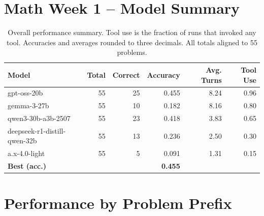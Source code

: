 \documentclass{article}
\begin{document}
\section*{Math Week 1 -- Model Summary}

\begin{table}[h!]
\centering
\begin{tabular}{lrrrrr}
\toprule
\textbf{Model} & \textbf{Total} & \textbf{Correct} & \textbf{Accuracy} & \textbf{Avg. Turns} & \textbf{Tool Use} \\
\midrule
gpt-oss-20b                  & 55 & 25 & 0.455 & 8.24 & 0.96 \\
gemma-3-27b                  & 55 & 10 & 0.182 & 8.16 & 0.80 \\
qwen3-30b-a3b-2507           & 55 & 23 & 0.418 & 3.83 & 0.65 \\
deepseek-r1-distill-qwen-32b & 55 & 13 & 0.236 & 2.50 & 0.30 \\
a.x-4.0-light                & 55 &  5 & 0.091 & 1.31 & 0.15 \\
\midrule
\textbf{Best (acc.)}         & {} & {} & \textbf{0.455} & {}   & {} \\
\bottomrule
\end{tabular}
\caption{Overall performance summary. Tool use is the fraction of runs that invoked any tool. Accuracies and averages rounded to three decimals. All totals aligned to 55 problems.}
\end{table}

\bigskip

\section*{Performance by Problem Prefix}
\end{document}
